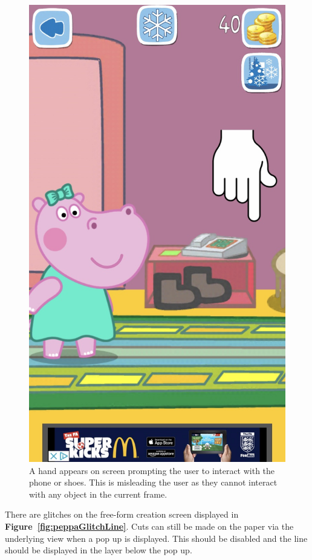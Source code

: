 \documentclass[11pt]{article}
\begin{document}
\begin{figure}[!ht]
\begin{minipage}{0.32\textwidth}
                            \includegraphics[width=0.8\linewidth]{Images/peppa/peppaGlitchPoint}
                             \caption{A hand appears on screen prompting the user to interact with the phone or shoes. This is misleading the user as they cannot interact with any object in the current frame.}
                            \label{fig:peppaGlitchPoint}
                        \end{minipage}
                    \end{figure}
                    
                    There are glitches on the free-form creation screen displayed in \textbf{Figure~\ref{fig:peppaGlitchLine}}. Cuts can still be made on the paper via the underlying view when a pop up is displayed. This should be disabled and the line should be displayed in the layer below the pop up.
                
\end{document}
